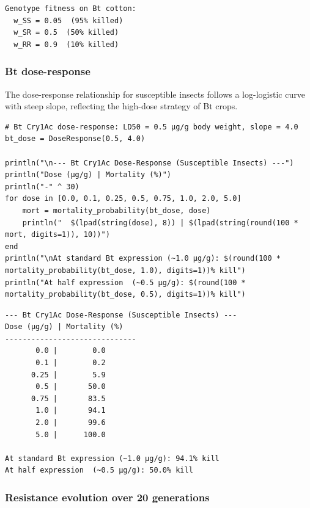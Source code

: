 \begin{verbatim}
Genotype fitness on Bt cotton:
  w_SS = 0.05  (95% killed)
  w_SR = 0.5  (50% killed)
  w_RR = 0.9  (10% killed)
\end{verbatim}



\subsubsection{Bt dose-response}



\label{4547386205614757548}{}


The dose-response relationship for susceptible insects follows a log-logistic curve with steep slope, reflecting the high-dose strategy of Bt crops.




\begin{verbatim}
# Bt Cry1Ac dose-response: LD50 = 0.5 μg/g body weight, slope = 4.0
bt_dose = DoseResponse(0.5, 4.0)

println("\n--- Bt Cry1Ac Dose-Response (Susceptible Insects) ---")
println("Dose (μg/g) | Mortality (%)")
println("-" ^ 30)
for dose in [0.0, 0.1, 0.25, 0.5, 0.75, 1.0, 2.0, 5.0]
    mort = mortality_probability(bt_dose, dose)
    println("  $(lpad(string(dose), 8)) | $(lpad(string(round(100 * mort, digits=1)), 10))")
end
println("\nAt standard Bt expression (~1.0 μg/g): $(round(100 * mortality_probability(bt_dose, 1.0), digits=1))% kill")
println("At half expression  (~0.5 μg/g): $(round(100 * mortality_probability(bt_dose, 0.5), digits=1))% kill")
\end{verbatim}




\begin{verbatim}
--- Bt Cry1Ac Dose-Response (Susceptible Insects) ---
Dose (μg/g) | Mortality (%)
------------------------------
       0.0 |        0.0
       0.1 |        0.2
      0.25 |        5.9
       0.5 |       50.0
      0.75 |       83.5
       1.0 |       94.1
       2.0 |       99.6
       5.0 |      100.0

At standard Bt expression (~1.0 μg/g): 94.1% kill
At half expression  (~0.5 μg/g): 50.0% kill
\end{verbatim}



\subsubsection{Resistance evolution over 20 generations}




